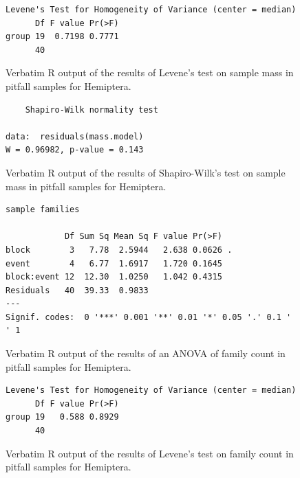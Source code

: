 \documentclass[10pt,letterpaper,twocolumn]{article}
\begin{document}
\begin{figure}[h]
	\lstset{numbers=left}
	\lstset{xleftmargin=5mm,framexleftmargin=5mm}
	\begin{lstlisting}
Levene's Test for Homogeneity of Variance (center = median)
      Df F value Pr(>F)
group 19  0.7198 0.7771
      40               
	\end{lstlisting}
	\caption{Verbatim R output of the results of Levene's test on sample mass in pitfall samples for Hemiptera.}
	\label{fig:pitfall_hemiptera_mass_levene}
	\smallskip
	\nointerlineskip
	\hrulefill
\end{figure}

\begin{figure}[h]
	\lstset{numbers=left}
	\lstset{xleftmargin=5mm,framexleftmargin=5mm}
	\begin{lstlisting}
	Shapiro-Wilk normality test

data:  residuals(mass.model)
W = 0.96982, p-value = 0.143
	\end{lstlisting}
	\caption{Verbatim R output of the results of Shapiro-Wilk's test on sample mass in pitfall samples for Hemiptera.}
	\label{fig:pitfall_hemiptera_mass_shapiro}
	\smallskip
	\nointerlineskip
	\hrulefill
\end{figure}

\begin{figure}[h]
	\lstset{numbers=left}
	\lstset{xleftmargin=5mm,framexleftmargin=5mm}
	\begin{lstlisting}
sample families 

            Df Sum Sq Mean Sq F value Pr(>F)  
block        3   7.78  2.5944   2.638 0.0626 .
event        4   6.77  1.6917   1.720 0.1645  
block:event 12  12.30  1.0250   1.042 0.4315  
Residuals   40  39.33  0.9833                 
---
Signif. codes:  0 '***' 0.001 '**' 0.01 '*' 0.05 '.' 0.1 ' ' 1
	\end{lstlisting}
	\caption{Verbatim R output of the results of an ANOVA of family count in pitfall samples for Hemiptera.}
	\label{fig:pitfall_hemiptera_family_anova}
	\smallskip
	\nointerlineskip
	\hrulefill
\end{figure}

\begin{figure}[h]
	\lstset{numbers=left}
	\lstset{xleftmargin=5mm,framexleftmargin=5mm}
	\begin{lstlisting}
Levene's Test for Homogeneity of Variance (center = median)
      Df F value Pr(>F)
group 19   0.588 0.8929
      40               
	\end{lstlisting}
	\caption{Verbatim R output of the results of Levene's test on family count in pitfall samples for Hemiptera.}
	\label{fig:pitfall_hemiptera_family_levene}
	\smallskip
	\nointerlineskip
	\hrulefill
\end{figure}
\end{document}
